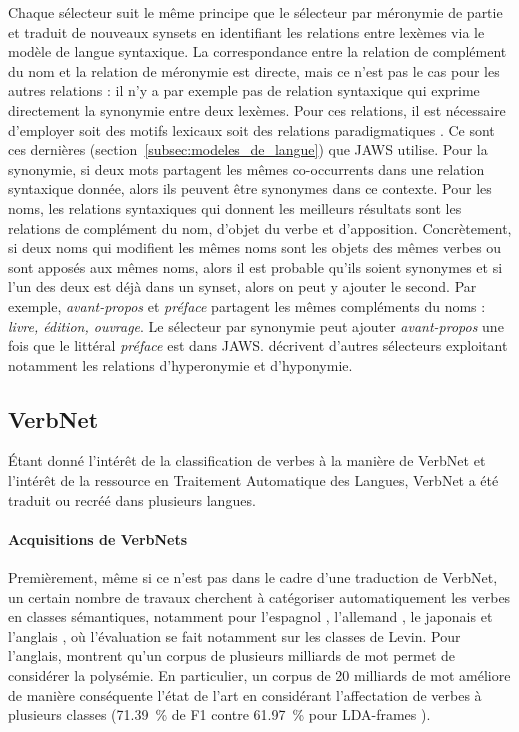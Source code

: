 Chaque sélecteur suit le même principe que le sélecteur par méronymie de partie
et traduit de nouveaux synsets en identifiant les relations entre lexèmes via
le modèle de langue syntaxique. La correspondance entre la relation de
complément du nom et la relation de méronymie est directe, mais ce n'est pas le
cas pour les autres relations : il n'y a par exemple pas de relation syntaxique
qui exprime directement la synonymie entre deux lexèmes. Pour ces relations, il
est nécessaire d'employer soit des motifs lexicaux \citep{hearst1992automatic}
soit des relations paradigmatiques \citep{lenci2012identifying}. Ce sont ces
dernières (section~\ref{subsec:modeles_de_langue}) que JAWS utilise. Pour la
synonymie, si deux mots partagent les mêmes co-occurrents dans une relation
syntaxique donnée, alors ils peuvent être synonymes dans ce contexte. Pour les
noms, les relations syntaxiques qui donnent les meilleurs résultats sont les
relations de complément du nom, d'objet du verbe et d'apposition. Concrètement,
si deux noms qui modifient les mêmes noms sont les objets des mêmes verbes ou
sont apposés aux mêmes noms, alors il est probable qu'ils soient synonymes et
si l'un des deux est déjà dans un synset, alors on peut y ajouter le second.
Par exemple, \textit{avant-propos} et \textit{préface} partagent les mêmes
compléments du noms : \textit{livre, édition, ouvrage}. Le sélecteur par
synonymie peut ajouter \textit{avant-propos} une fois que le littéral
\textit{préface} est dans JAWS. \citep{mouton2010jaws,mouton2010phd} décrivent
d'autres sélecteurs exploitant notamment les relations d'hyperonymie et
d'hyponymie.

\subsection{VerbNet}

Étant donné l'intérêt de la classification de verbes à la manière de VerbNet
\citep{hartshorne2014verbcorner} et l'intérêt de la ressource en Traitement
Automatique des Langues, VerbNet a été traduit ou recréé dans plusieurs
langues.

\paragraph{Acquisitions de VerbNets}

Premièrement, même si ce n'est pas dans le cadre d'une traduction de VerbNet,
un certain nombre de travaux cherchent à catégoriser automatiquement les verbes
en classes sémantiques, notamment pour l'espagnol \citep{ferrer2004towards},
l'allemand \citep{im2006experiments}, le japonais \citep{suzuki2009classifying}
et l'anglais
\citep{stevenson2003semi,lapata2004verb,vlachos2009unsupervised,lippincott2012learning,kawahara2014step},
où l'évaluation se fait notamment sur les classes de Levin. Pour l'anglais,
\citep{kawahara2014step} montrent qu'un corpus de plusieurs milliards de mot
permet de considérer la polysémie. En particulier, un corpus de 20 milliards de
mot améliore de manière conséquente l'état de l'art en considérant
l'affectation de verbes à plusieurs classes (71.39~\% de F1 contre 61.97~\%
pour LDA-frames \citep{materna2012lda}).

